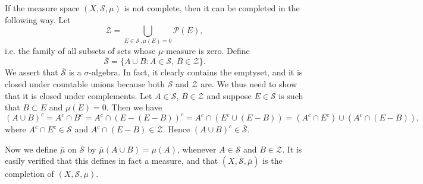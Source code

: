 \documentclass[12pt]{article}
\begin{document}
If the measure space $(X,\mathscr{S},\mu)$ is not complete, then it can be completed in the following way. Let 
$$\mathscr{Z} = \bigcup_{E\in\mathscr{S}\, ,\mu(E)=0} \mathscr{P}(E),$$
i.e. the family of all subsets of sets whose $\mu$-measure is zero.
Define
$$\overline{\mathscr{S}} = \{A \cup B : A\in \mathscr{S}, \, B\in \mathscr{Z}\}.$$
We assert that $\overline{\mathscr{S}}$ is a $\sigma$-algebra. In fact, it clearly contains the emptyset, and it is closed under countable unions because both $\mathscr{S}$ and $\mathscr{Z}$ are. We thus need to show that it is closed under complements. Let $A\in \mathscr{S}$, $B\in\mathscr{Z}$ and suppose $E\in\mathscr{S}$ is such that $B\subset E$ and $\mu(E)=0$.
Then we have $$(A\cup B)^c = A^c\cap B^c = A^c\cap (E-(E-B))^c = A^c\cap (E^c\cup (E-B)) = (A^c\cap E^c) \cup (A^c\cap(E-B)),$$
where $A^c\cap E^c\in \mathscr{S}$ and  $A^c\cap(E-B)\in\mathscr{Z}$. Hence $(A\cup B)^c \in \overline{\mathscr{S}}$. 

Now we define $\overline{\mu}$ on $\overline{\mathscr{S}}$ by $\overline{\mu}(A\cup B) = \mu(A)$, whenever $A\in \mathscr{S}$ and $B\in\mathscr{Z}$. It is easily verified that this defines in fact a measure, and that $(X,\overline{\mathscr{S}},\overline{\mu})$ is the completion of $(X,\mathscr{S},\mu)$.
\end{document}
